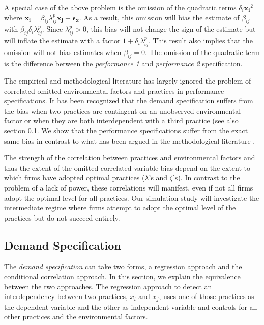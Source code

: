 \documentclass[12pt]{article}
\begin{document}
A special case of the above problem is the omission of the quadratic terms $\delta_i \mathbf{x_i}^2$ where $\mathbf{x_i} =  \beta_{ij} \lambda^p_{ij} \mathbf{x_j} + \mathbf{\epsilon_x}$. As a result, this omission will bias the estimate of $\beta_{ij}$ with $\beta_{ij} 
\delta_i \lambda^p_{ij}$. Since $\lambda^p_{ij} > 0$, this bias will not change the sign of the estimate but will inflate the estimate with a factor $1 + \delta_i \lambda^p_{ij}$.  This result also implies that the omission will not bias estimates when $\beta_{ij} = 0$. The omission of the quadratic term is the difference between the \emph{performance 1} and \emph{performance 2} specification.

The empirical and methodological literature has largely ignored the problem of correlated omitted environmental factors and practices in performance specifications. It has been recognized that the demand specification suffers from the bias when two practices are contingent on an unobserved environmental factor or when they are both interdependent with a third practice (see also section \ref{demand-specification}. We show that the performance specifications suffer from the exact same bias in contrast to what has been argued in the methodological literature \citep{Carree2011}. 

The strength of the correlation between practices and environmental factors and thus the extent of the omitted correlated variable bias depend on the extent to which firms have adopted optimal practices ($\lambda$'s and $\zeta$'s). In contrast to the problem of a lack of power, these correlations will manifest, even if not all firms adopt the optimal level for all practices. Our simulation study will investigate the intermediate regime where firms attempt to adopt the optimal level of the practices but do not succeed entirely.

\subsection{Demand Specification}\label{demand-specification}

The \emph{demand specification} can take two forms, a regression approach and the conditional correlation approach. In this section, we explain the equivalence between the two approaches. The regression  approach to detect an interdependency between two practices, $x_i$ and $x_j$, uses one of those practices as the dependent variable and the other as independent variable and controls for all other practices and the environmental factors.
\end{document}
